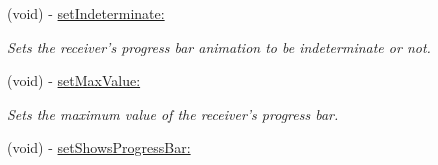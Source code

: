 \begin{CompactItemize}
(void) - \hyperlink{interface_s_s_y_alert_45ca8f6438df88f90a5fdadbf0e9e8b4}{setIndeterminate:}
\begin{CompactList}\small\item\em Sets the receiver's progress bar animation to be indeterminate or not. \item\end{CompactList}\item 
(void) - \hyperlink{interface_s_s_y_alert_a581989651d0253051484d8b87c4b9db}{setMaxValue:}
\begin{CompactList}\small\item\em Sets the maximum value of the receiver's progress bar. \item\end{CompactList}\item 
\hypertarget{interface_s_s_y_alert_dfe97ccfa31ae7f89f22140a75cdb272}{
(void) - \hyperlink{interface_s_s_y_alert_dfe97ccfa31ae7f89f22140a75cdb272}{setShowsProgressBar:}}
\label{interface_s_s_y_alert_dfe97ccfa31ae7f89f22140a75cdb272}


\end{CompactItemize}
